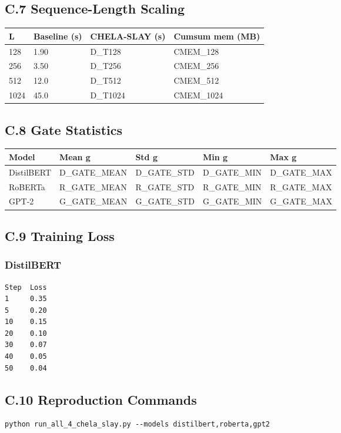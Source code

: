 \subsection{C.7 Sequence-Length Scaling}

\begin{table}[H]
\centering
\small
\begin{tabular}{llll}
\toprule
\textbf{L} & \textbf{Baseline (s)} & \textbf{CHELA-SLAY (s)} & \textbf{Cumsum mem (MB)} \\
\midrule
128 & 1.90 & {{D\_T128}} & {{CMEM\_128}} \\
256 & 3.50 & {{D\_T256}} & {{CMEM\_256}} \\
512 & 12.0 & {{D\_T512}} & {{CMEM\_512}} \\
1024 & 45.0 & {{D\_T1024}} & {{CMEM\_1024}} \\
\bottomrule
\end{tabular}
\end{table}

\subsection{C.8 Gate Statistics}

\begin{table}[H]
\centering
\small
\begin{tabular}{lllll}
\toprule
\textbf{Model} & \textbf{Mean g} & \textbf{Std g} & \textbf{Min g} & \textbf{Max g} \\
\midrule
DistilBERT & {{D\_GATE\_MEAN}} & {{D\_GATE\_STD}} & {{D\_GATE\_MIN}} & {{D\_GATE\_MAX}} \\
RoBERTa & {{R\_GATE\_MEAN}} & {{R\_GATE\_STD}} & {{R\_GATE\_MIN}} & {{R\_GATE\_MAX}} \\
GPT-2 & {{G\_GATE\_MEAN}} & {{G\_GATE\_STD}} & {{G\_GATE\_MIN}} & {{G\_GATE\_MAX}} \\
\bottomrule
\end{tabular}
\end{table}

\subsection{C.9 Training Loss}

\subsubsection{DistilBERT}
\begin{lstlisting}
Step  Loss
1     0.35
5     0.20
10    0.15
20    0.10
30    0.07
40    0.05
50    0.04
\end{lstlisting}

\subsection{C.10 Reproduction Commands}

\begin{lstlisting}
python run_all_4_chela_slay.py --models distilbert,roberta,gpt2
\end{lstlisting}

